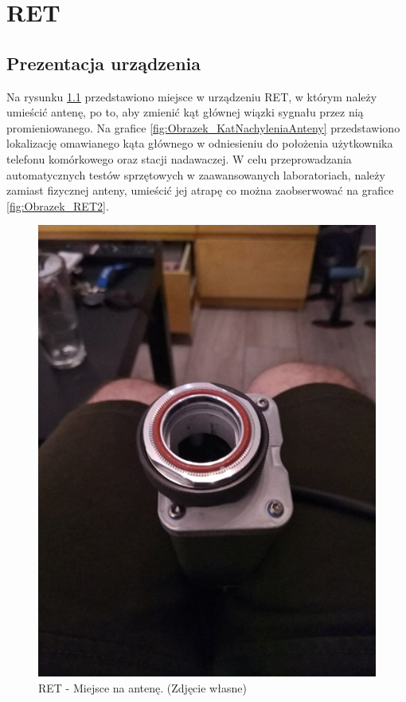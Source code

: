 \chapter{RET}
	\section{Prezentacja urządzenia}
		Na rysunku \ref{fig:Obrazek_RET1} przedstawiono miejsce w urządzeniu RET, w którym należy umieścić antenę, po to, aby 
		zmienić kąt głównej wiązki sygnału przez nią promieniowanego. Na grafice \ref{fig:Obrazek_KatNachyleniaAnteny} 
		przedstawiono lokalizację omawianego kąta głównego w odniesieniu do położenia użytkownika telefonu komórkowego oraz 
		stacji nadawaczej.
		W celu przeprowadzania automatycznych testów sprzętowych w zaawansowanych laboratoriach, należy zamiast fizycznej anteny, umieścić jej atrapę co można zaobserwować
		na grafice \ref{fig:Obrazek_RET2}.
		\begin{figure}[h!]
			\centering
			\includegraphics[scale=0.4]{Obrazki/RET_1.png}
			\caption{RET - Miejsce na antenę.
				\newline(Zdjęcie własne)}
			\label{fig:Obrazek_RET1}	
		\end{figure}

